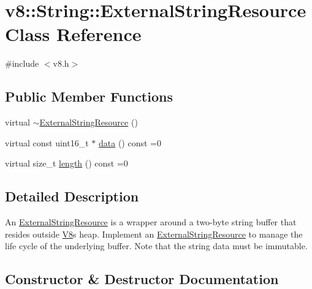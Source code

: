 \hypertarget{classv8_1_1_string_1_1_external_string_resource}{}\section{v8\+:\+:String\+:\+:External\+String\+Resource Class Reference}
\label{classv8_1_1_string_1_1_external_string_resource}


{\ttfamily \#include $<$v8.\+h$>$}

\subsection*{Public Member Functions}
\begin{DoxyCompactItemize}
\item 
virtual \hyperlink{classv8_1_1_string_1_1_external_string_resource_a6b7ef9e33a47059092e1447b10c35416}{$\sim$\+External\+String\+Resource} ()
\item 
virtual const uint16\+\_\+t $\ast$ \hyperlink{classv8_1_1_string_1_1_external_string_resource_a987309199b848511adb708e221e0fb0a}{data} () const =0
\item 
virtual size\+\_\+t \hyperlink{classv8_1_1_string_1_1_external_string_resource_ab5ca300fea077d7c7774ec49d32e4da1}{length} () const =0
\end{DoxyCompactItemize}


\subsection{Detailed Description}
An \hyperlink{classv8_1_1_string_1_1_external_string_resource}{External\+String\+Resource} is a wrapper around a two-\/byte string buffer that resides outside \hyperlink{classv8_1_1_v8}{V8}\textquotesingle{}s heap. Implement an \hyperlink{classv8_1_1_string_1_1_external_string_resource}{External\+String\+Resource} to manage the life cycle of the underlying buffer. Note that the string data must be immutable. 

\subsection{Constructor \& Destructor Documentation}
\hypertarget{classv8_1_1_string_1_1_external_string_resource_a6b7ef9e33a47059092e1447b10c35416}{}
